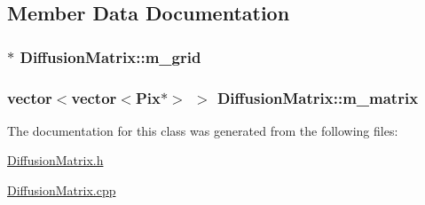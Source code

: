\subsection{Member Data Documentation}
\hypertarget{class_diffusion_matrix_a9a2d526a20f9fdfc1b29f0f9f2ce7aef}{
\subsubsection[{m\+\_\+grid}]{$\ast$ Diffusion\+Matrix\+::m\+\_\+grid}}\label{class_diffusion_matrix_a9a2d526a20f9fdfc1b29f0f9f2ce7aef}
\hypertarget{class_diffusion_matrix_ae1245cf5edce1c99cc127ed8a82e65ad}{
\subsubsection[{m\+\_\+matrix}]{\setlength{\rightskip}{0pt plus 5cm}vector$<$vector$<${\bf Pix}$\ast$$>$ $>$ Diffusion\+Matrix\+::m\+\_\+matrix}}\label{class_diffusion_matrix_ae1245cf5edce1c99cc127ed8a82e65ad}


The documentation for this class was generated from the following files\+:\begin{DoxyCompactItemize}
\item 
\hyperlink{_diffusion_matrix_8h}{Diffusion\+Matrix.\+h}\item 
\hyperlink{_diffusion_matrix_8cpp}{Diffusion\+Matrix.\+cpp}\end{DoxyCompactItemize}
